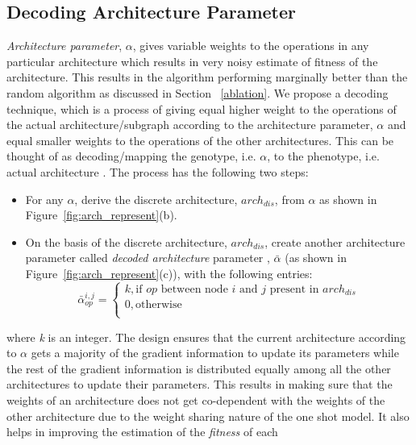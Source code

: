 \documentclass[final]{cvpr}
\begin{document}
\subsection{Decoding Architecture Parameter}\label{subsec:decode}
\textit{Architecture parameter}, $\alpha$, gives variable weights to the operations in any
particular architecture which results in very noisy estimate of fitness of the architecture. This
results in the algorithm performing marginally better than the random algorithm as discussed in
Section ~\ref{ablation}. We propose a decoding technique, which is a process of giving equal higher
weight to the operations of the actual architecture/subgraph according to the architecture
parameter, $\alpha$ and equal smaller weights to the operations of the other architectures. This
can be thought of as decoding/mapping the genotype, i.e. $\alpha$, to the phenotype, i.e. actual
architecture \cite{eiben2003introduction}. The process has the following two steps:
\begin{itemize}
    \item For any $\alpha$, derive the discrete architecture, $arch_{dis}$, from 
    $\alpha$ as shown in Figure~\ref{fig:arch_represent}(b).
    \item On the basis of the discrete architecture, $arch_{dis}$, create 
    another architecture parameter called \textit{decoded architecture} parameter
    , $\bar{\alpha}$ (as shown in Figure~\ref{fig:arch_represent}(c)), with the following entries:
        \begin{equation}
            \bar{\alpha}^{i,j}_{op} = 
                \begin{cases}
                k, \text{if $op$ between node $i$ and $j$ present in $arch_{dis}$}
                \\
                0,  \text{otherwise}
                \\
                \end{cases}    
        \end{equation}
\end{itemize}
where \textit{k} is an integer. The design ensures that the current architecture according to
$\alpha$ gets a majority of the gradient information to update its parameters while the rest of
the gradient information is distributed equally among all the other architectures to update their
parameters. This results in making sure that the weights of an architecture does not get
co-dependent with the weights of the other architecture due to the weight sharing nature of the
one shot model. It also helps in improving the estimation of the \textit{fitness} of each
\end{document}
